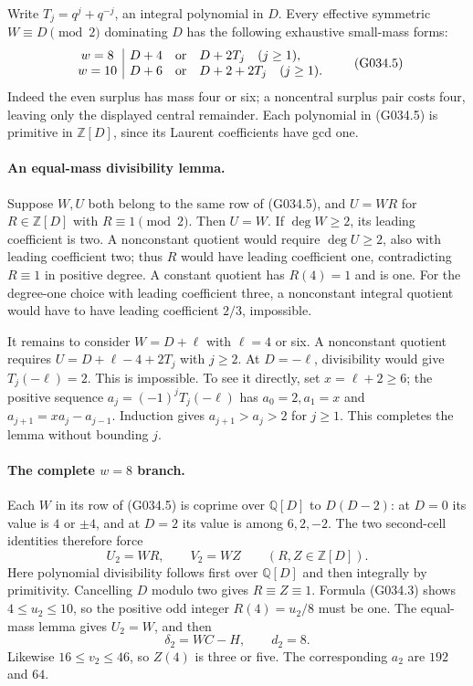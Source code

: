 Write $T_j=q^j+q^{-j}$, an integral polynomial in $D$.
Every effective symmetric $W\equiv D\pmod2$
dominating $D$ has the following exhaustive small-mass forms:
\[
 \begin{array}{c|l}
 w=8&D+4\quad\hbox{or}\quad D+2T_j\quad(j\ge1),\\
 w=10&D+6\quad\hbox{or}\quad D+2+2T_j\quad(j\ge1).
 \end{array}                                                       \tag{G034.5}
\]
Indeed the even surplus has mass four or six; a noncentral
surplus pair costs four, leaving only the displayed central
remainder. Each polynomial in (G034.5) is primitive in
$\mathbb Z[D]$, since its Laurent coefficients have gcd one.

\paragraph{An equal-mass divisibility lemma.}
Suppose $W,U$ both belong to the same row of (G034.5),
and $U=WR$ for $R\in\mathbb Z[D]$ with $R\equiv1\pmod2$.
Then $U=W$.
If $\deg W\ge2$, its leading coefficient is two.
A nonconstant quotient would require $\deg U\ge2$,
also with leading coefficient two; thus $R$ would have
leading coefficient one, contradicting $R\equiv1$
in positive degree. A constant quotient has $R(4)=1$
and is one. For the degree-one choice with leading
coefficient three, a nonconstant integral quotient would
have to have leading coefficient $2/3$, impossible.

It remains to consider $W=D+\ell$ with $\ell=4$ or six.
A nonconstant quotient requires
$U=D+\ell-4+2T_j$ with $j\ge2$.
At $D=-\ell$, divisibility would give $T_j(-\ell)=2$.
This is impossible. To see it directly, set $x=\ell+2\ge6$;
the positive sequence
$a_j=(-1)^jT_j(-\ell)$ has $a_0=2,a_1=x$ and
$a_{j+1}=xa_j-a_{j-1}$. Induction gives
$a_{j+1}>a_j>2$ for $j\ge1$.
This completes the lemma without bounding $j$.

\paragraph{The complete $w=8$ branch.}
Each $W$ in its row of (G034.5) is coprime over
$\mathbb Q[D]$ to $D(D-2)$: at $D=0$ its value is
$4$ or $\pm4$, and at $D=2$ its value is among
$6,2,-2$. The two second-cell identities therefore
force
\[
 U_2=WR,\qquad V_2=WZ\qquad(R,Z\in\mathbb Z[D]).
\]
Here polynomial divisibility follows first over
$\mathbb Q[D]$ and then integrally by primitivity.
Cancelling $D$ modulo two gives $R\equiv Z\equiv1$.
Formula (G034.3) shows $4\le u_2\le10$, so the
positive odd integer $R(4)=u_2/8$ must be one.
The equal-mass lemma gives $U_2=W$, and then
\[
                 \delta_2=WC-H,\qquad d_2=8.         \tag{G034.6}
\]
Likewise $16\le v_2\le46$, so $Z(4)$ is three or five.
The corresponding $a_2$ are $192$ and $64$.

